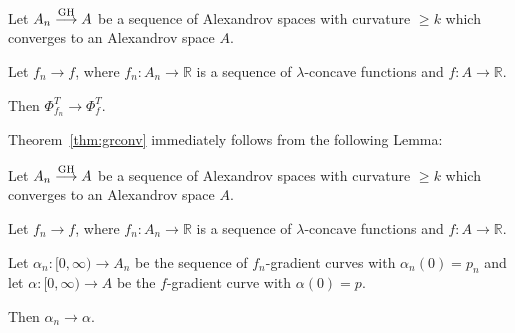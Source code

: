 \documentclass{amsart}
\begin{document}
\begin{thm}\label{thm:grconv}
Let $A_n \GHto A$
be a sequence of Alexandrov spaces with curvature $\ge k$
which converges to an Alexandrov space $A$.

Let $f_n\to f$, where $f_n\colon A_n\to \mathbb{R}$ is a sequence of $\lambda$-concave functions and $f\colon A\to \mathbb{R}$.

Then  $\Phi_{f_n}^T\to\Phi_f^T$.

\end{thm}

Theorem~\ref{thm:grconv}  immediately follows  from the following Lemma:

\begin{lem}Let $A_n \GHto A$
be a sequence of Alexandrov spaces with curvature $\ge k$
which converges to an Alexandrov space $A$.

Let $f_n\to f$, where $f_n\colon A_n\to \mathbb{R}$ is a sequence of $\lambda$-concave functions and $f\colon A\to \mathbb{R}$.

Let $\alpha_n\colon  [0,\infty) \to A_n$ be the sequence of
$f_n$-gradient curves with $\alpha_n(0)=p_n$ and
let $\alpha\colon  [0,\infty) \to A$ be the $f$-gradient curve with $\alpha(0)=p$.

Then $\alpha_n\to\alpha$.
\end{lem}
\end{document}

